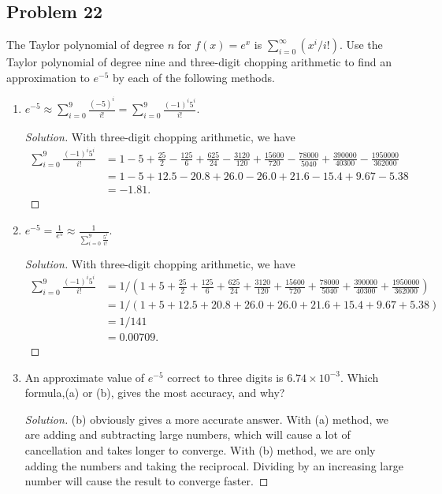 \documentclass{article}
\begin{document}
\subsection*{Problem 22}
The Taylor polynomial of degree $n$ for $f(x) = e^x$ is $\sum_{i=0}^\infty(x^i/i!)$. Use the Taylor 
polynomial of degree nine and three-digit chopping arithmetic to find an approximation to $e^{-5}$ 
by each of the following methods.
\begin{enumerate}[label=\alph*.]
    \item $e^{-5} \approx \sum\limits_{i=0}^9\frac{(-5)^i}{i!} = 
    \sum\limits_{i=0}^9\frac{(-1)^i5^i}{i!}$.
    \begin{proof}[Solution]
        With three-digit chopping arithmetic, we have
        \begin{align*}
            \sum\limits_{i=0}^9\frac{(-1)^i5^i}{i!} & = 1 - 5 + \frac{25}{2} - \frac{125}{6} + 
            \frac{625}{24} - \frac{3120}{120} + \frac{15600}{720} - \frac{78000}{5040} + 
            \frac{390000}{40300} - \frac{1950000}{362000} \\
            & = 1 - 5 + 12.5 - 20.8 + 26.0 - 26.0 + 21.6 - 15.4 + 9.67 - 5.38 \\
            & = -1.81.
        \end{align*}
    \end{proof}
    
    \item $e^{-5} = \frac{1}{e^5} \approx \frac{1}{\sum_{i=0}^{9}\frac{5^i}{i!}}$.
    \begin{proof}[Solution]
        With three-digit chopping arithmetic, we have
        \begin{align*}
            \sum\limits_{i=0}^9\frac{(-1)^i5^i}{i!} & = 1 / \left(1 + 5 + \frac{25}{2} + \frac{125}{6} + 
            \frac{625}{24} + \frac{3120}{120} + \frac{15600}{720} + \frac{78000}{5040} + 
            \frac{390000}{40300} + \frac{1950000}{362000}\right) \\
            & = 1/ (1 + 5 + 12.5 + 20.8 + 26.0 + 26.0 + 21.6 + 15.4 + 9.67 + 5.38) \\
            & = 1/141 \\
            & = 0.00709.
        \end{align*}
    \end{proof}
    
    \item An approximate value of $e^{-5}$ correct to three digits is $6.74\times 10^{-3}$. 
    Which formula,(a) or (b), gives the most accuracy, and why?
    \begin{proof}[Solution]
        (b) obviously gives a more accurate answer. With (a) method, we are adding and subtracting 
        large numbers, which will cause a lot of cancellation and takes longer to converge. With 
        (b) method, we are only adding the numbers and taking the reciprocal. Dividing by an 
        increasing large number will cause the result to converge faster.
    \end{proof}
\end{enumerate}
\end{document}
